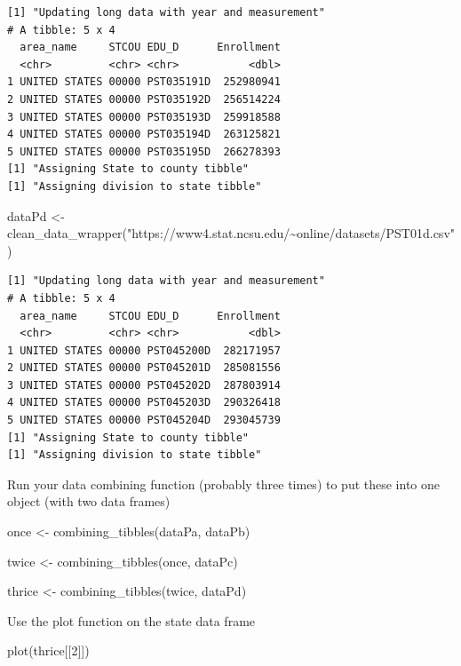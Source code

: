 \documentclass[
  letterpaper,
  DIV=11,
  numbers=noendperiod]{scrartcl}
\newenvironment{Shaded}{\begin{snugshade}}{\end{snugshade}}
\newcommand{\DecValTok}[1]{\textcolor[rgb]{0.68,0.00,0.00}{#1}}
\newcommand{\FunctionTok}[1]{\textcolor[rgb]{0.28,0.35,0.67}{#1}}
\newcommand{\NormalTok}[1]{\textcolor[rgb]{0.00,0.23,0.31}{#1}}
\newcommand{\OtherTok}[1]{\textcolor[rgb]{0.00,0.23,0.31}{#1}}
\newcommand{\StringTok}[1]{\textcolor[rgb]{0.13,0.47,0.30}{#1}}
\begin{document}
\begin{verbatim}
[1] "Updating long data with year and measurement"
# A tibble: 5 x 4
  area_name     STCOU EDU_D      Enrollment
  <chr>         <chr> <chr>           <dbl>
1 UNITED STATES 00000 PST035191D  252980941
2 UNITED STATES 00000 PST035192D  256514224
3 UNITED STATES 00000 PST035193D  259918588
4 UNITED STATES 00000 PST035194D  263125821
5 UNITED STATES 00000 PST035195D  266278393
[1] "Assigning State to county tibble"
[1] "Assigning division to state tibble"
\end{verbatim}

\begin{Shaded}
\begin{Highlighting}[]
\NormalTok{dataPd }\OtherTok{\textless{}{-}} \FunctionTok{clean\_data\_wrapper}\NormalTok{(}\StringTok{"https://www4.stat.ncsu.edu/\textasciitilde{}online/datasets/PST01d.csv"}\NormalTok{)}
\end{Highlighting}
\end{Shaded}

\begin{verbatim}
[1] "Updating long data with year and measurement"
# A tibble: 5 x 4
  area_name     STCOU EDU_D      Enrollment
  <chr>         <chr> <chr>           <dbl>
1 UNITED STATES 00000 PST045200D  282171957
2 UNITED STATES 00000 PST045201D  285081556
3 UNITED STATES 00000 PST045202D  287803914
4 UNITED STATES 00000 PST045203D  290326418
5 UNITED STATES 00000 PST045204D  293045739
[1] "Assigning State to county tibble"
[1] "Assigning division to state tibble"
\end{verbatim}

Run your data combining function (probably three times) to put these
into one object (with two data frames)

\begin{Shaded}
\begin{Highlighting}[]
\NormalTok{once }\OtherTok{\textless{}{-}} \FunctionTok{combining\_tibbles}\NormalTok{(dataPa, dataPb)}

\NormalTok{twice }\OtherTok{\textless{}{-}} \FunctionTok{combining\_tibbles}\NormalTok{(once, dataPc)}

\NormalTok{thrice }\OtherTok{\textless{}{-}} \FunctionTok{combining\_tibbles}\NormalTok{(twice, dataPd)}
\end{Highlighting}
\end{Shaded}

Use the plot function on the state data frame

\begin{Shaded}
\begin{Highlighting}[]
\FunctionTok{plot}\NormalTok{(thrice[[}\DecValTok{2}\NormalTok{]])}
\end{Highlighting}
\end{Shaded}
\end{document}
